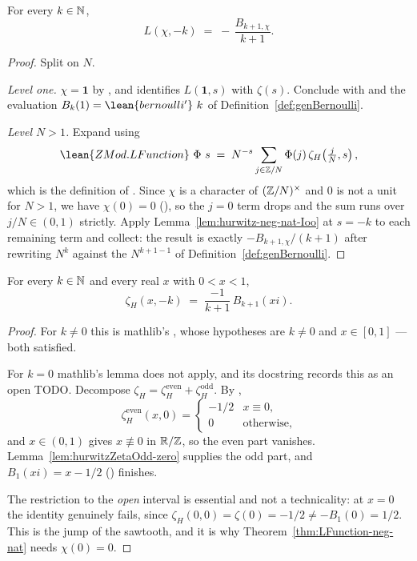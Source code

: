 \begin{theorem}
  \label{thm:LFunction-neg-nat}
  \leanok
  For every $k \in \mathbb{N}$,
  \[ L(\chi,-k) \;=\; -\,\frac{B_{k+1,\chi}}{k+1}. \]
\end{theorem}
\begin{proof}
  Split on $N$.

  \emph{Level one.} $\chi = \mathbf{1}$ by , and
   identifies $L(\mathbf{1},s)$ with $\zeta(s)$.
  Conclude with  and the evaluation
  $B_k(1) = \lean{bernoulli'}\ k$ of Definition~\ref{def:genBernoulli}.

  \emph{Level $N > 1$.} Expand using
  \[ \lean{ZMod.LFunction}\ \Phi\ s \;=\; N^{-s} \sum_{j \in \Z/N} \Phi(j)\, \zeta_H\!\left(\tfrac{j}{N}, s\right), \]
  which is the definition of . Since $\chi$ is a character of
  $(\mathbb{Z}/N)^{\times}$ and $0$ is not a unit for $N > 1$, we have $\chi(0) = 0$
  (), so the $j = 0$ term drops and the sum runs over
  $j/N \in (0,1)$ strictly. Apply Lemma~\ref{lem:hurwitz-neg-nat-Ioo} at $s = -k$ to
  each remaining term and collect: the result is exactly
  $-B_{k+1,\chi}/(k+1)$ after rewriting $N^{k}$ against the $N^{k+1-1}$ of
  Definition~\ref{def:genBernoulli}.
\end{proof}

\begin{lemma}
  \label{lem:hurwitz-neg-nat-Ioo}
  \leanok
  For every $k \in \mathbb{N}$ and every real $x$ with $0 < x < 1$,
  \[ \zeta_H(x,-k) \;=\; \frac{-1}{k+1}\, B_{k+1}(xi). \]
\end{lemma}
\begin{proof}
  For $k \neq 0$ this is mathlib's , whose
  hypotheses are $k \neq 0$ and $x \in [0,1]$ --- both satisfied.

  For $k = 0$ mathlib's lemma does not apply, and its docstring records this as an
  open TODO. Decompose $\zeta_H = \zeta_H^{\mathrm{even}} + \zeta_H^{\mathrm{odd}}$.
  By ,
  \[ \zeta_H^{\mathrm{even}}(x,0) = \begin{cases} -1/2 & x \equiv 0, \\ 0 & \text{otherwise},\end{cases} \]
  and $x \in (0,1)$ gives $x \not\equiv 0$ in $\mathbb{R}/\mathbb{Z}$, so the even part vanishes.
  Lemma~\ref{lem:hurwitzZetaOdd-zero} supplies the odd part, and
  $B_1(xi) = x - 1/2$ () finishes.

  The restriction to the \emph{open} interval is essential and not a technicality:
  at $x = 0$ the identity genuinely fails, since
  $\zeta_H(0,0) = \zeta(0) = -1/2 \neq -B_1(0) = 1/2$. This is the jump of the
  sawtooth, and it is why Theorem~\ref{thm:LFunction-neg-nat} needs $\chi(0) = 0$.
\end{proof}

